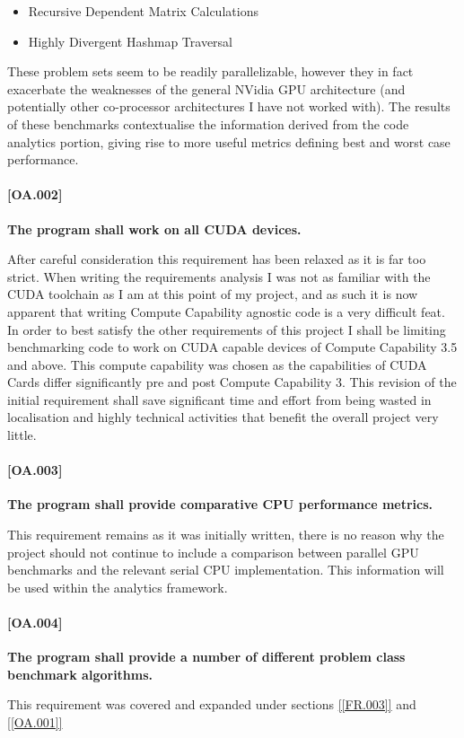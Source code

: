 \begin{itemize}
\item Recursive Dependent Matrix Calculations
\item Highly Divergent Hashmap Traversal 
\end{itemize}

These problem sets seem to be readily parallelizable, however they in fact exacerbate the weaknesses of the general NVidia GPU architecture (and potentially other co-processor architectures I have not worked with). The results of these benchmarks contextualise the information derived from the code analytics portion, giving rise to more useful metrics defining best and worst case performance.

\paragraph{[OA.002]}
\textbf{The program shall work on all CUDA devices.}

After careful consideration this requirement has been relaxed as it is far too strict. When writing the requirements analysis I was not as familiar with the CUDA toolchain as I am at this point of my project, and as such it is now apparent that writing Compute Capability agnostic code is a very difficult feat. In order to best satisfy the other requirements of this project I shall be limiting benchmarking code to work on CUDA capable devices of Compute Capability 3.5 and above. This compute capability was chosen as the capabilities of CUDA Cards differ significantly pre and post Compute Capability 3. This revision of the initial requirement shall save significant time and effort from being wasted in localisation and highly technical activities that benefit the overall project very little.

\paragraph{[OA.003]}
\textbf{The program shall provide comparative CPU performance metrics.}

This requirement remains as it was initially written, there is no reason why the project should not continue to include a comparison between parallel GPU benchmarks and the relevant serial CPU implementation. This information will be used within the analytics framework.

\paragraph{[OA.004]}
\textbf{The program shall provide a number of different problem class
benchmark algorithms.}

This requirement was covered and expanded under sections \ref{[FR.003]} and \ref{[OA.001]}













